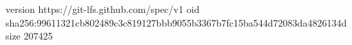 version https://git-lfs.github.com/spec/v1
oid sha256:99611321cb802489c3c819127bbb9055b3367b7fc15ba544d72083da4826134d
size 207425
